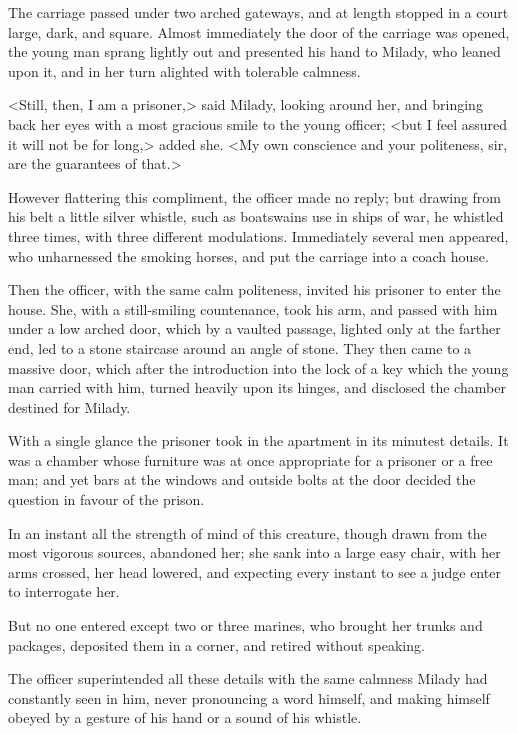 The carriage passed under two arched gateways, and at length stopped in a court large, dark, and square. Almost immediately the door of the carriage was opened, the young man sprang lightly out and presented his hand to Milady, who leaned upon it, and in her turn alighted with tolerable calmness. 

<Still, then, I am a prisoner,> said Milady, looking around her, and bringing back her eyes with a most gracious smile to the young officer; <but I feel assured it will not be for long,> added she. <My own conscience and your politeness, sir, are the guarantees of that.> 

However flattering this compliment, the officer made no reply; but drawing from his belt a little silver whistle, such as boatswains use in ships of war, he whistled three times, with three different modulations. Immediately several men appeared, who unharnessed the smoking horses, and put the carriage into a coach house. 

Then the officer, with the same calm politeness, invited his prisoner to enter the house. She, with a still-smiling countenance, took his arm, and passed with him under a low arched door, which by a vaulted passage, lighted only at the farther end, led to a stone staircase around an angle of stone. They then came to a massive door, which after the introduction into the lock of a key which the young man carried with him, turned heavily upon its hinges, and disclosed the chamber destined for Milady. 

With a single glance the prisoner took in the apartment in its minutest details. It was a chamber whose furniture was at once appropriate for a prisoner or a free man; and yet bars at the windows and outside bolts at the door decided the question in favour of the prison. 

In an instant all the strength of mind of this creature, though drawn from the most vigorous sources, abandoned her; she sank into a large easy chair, with her arms crossed, her head lowered, and expecting every instant to see a judge enter to interrogate her. 

But no one entered except two or three marines, who brought her trunks and packages, deposited them in a corner, and retired without speaking. 

The officer superintended all these details with the same calmness Milady had constantly seen in him, never pronouncing a word himself, and making himself obeyed by a gesture of his hand or a sound of his whistle. 

